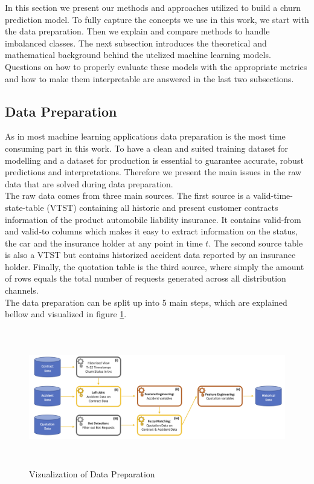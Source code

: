 \documentclass[12pt,titlepage]{article}
\begin{document}
In this section we present our methods and approaches utilized to build a churn prediction model. To fully capture the concepts we use in this work, we start with the data preparation. Then we explain and compare methods to handle imbalanced classes. The next subsection introduces the theoretical and mathematical background behind the utelized machine learning models. Questions on how to properly evaluate these models with the appropriate metrics and how to make them interpretable are answered in the last two subsections. \\

\subsection{Data Preparation} \par
\label{chap:dataprep}

As in most machine learning applications data preparation is the most time consuming part in this work. To have a clean and suited training dataset for modelling and a dataset for production is essential to guarantee accurate, robust predictions and interpretations. Therefore we present the main issues in the raw data that are solved during data preparation. \\
The raw data comes from three main sources. The first source is a valid-time-state-table (VTST) containing all historic and present customer contracts information of the product automobile liability insurance. It contains valid-from and valid-to columns which makes it easy to extract information on the status, the car and the insurance holder at any point in time $t$. The second source table is also a VTST but contains historized accident data reported by an insurance holder. Finally, the quotation table is the third source, where simply the amount of rows equals the total number of requests generated across all distribution channels. \\
The data preparation can be split up into 5 main steps, which are explained bellow and visualized in figure \ref{fig:preparation}. \\
\begin{figure}[H]
    \centerline{\includegraphics[height=6cm]{data_preparation.png}}
\caption{Vizualization of Data Preparation}
\label{fig:preparation}
\end{figure}
\end{document}
